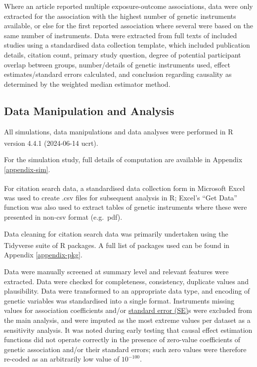 \documentclass[
]{article}
\begin{document}
Where an article reported multiple exposure-outcome associations, data were only extracted for the association with the highest number of genetic instruments available, or else for the first reported association where several were based on the same number of instruments. Data were extracted from full texts of included studies using a standardised data collection template, which included publication details, citation count, primary study question, degree of potential participant overlap between groups, number/details of genetic instruments used, effect estimates/standard errors calculated, and conclusion regarding causality as determined by the weighted median estimator method.

\subsection{Data Manipulation and Analysis}\label{data-manipulation-and-analysis}

All simulations, data manipulations and data analyses were performed in R version 4.4.1 (2024-06-14 ucrt)\textsuperscript{}.

For the simulation study, full details of computation are available in Appendix \ref{appendix-sim}.

For citation search data, a standardised data collection form in Microsoft Excel\textsuperscript{} was used to create .csv files for subsequent analysis in R; Excel's ``Get Data'' function was also used to extract tables of genetic instruments where these were presented in non-csv format (e.g.~pdf).

Data cleaning for citation search data was primarily undertaken using the Tidyverse suite of R packages\textsuperscript{}. A full list of packages used can be found in Appendix \ref{appendix-pkg}.

Data were manually screened at summary level and relevant features were extracted. Data were checked for completeness, consistency, duplicate values and plausibility. Data were transformed to an appropriate data type, and encoding of genetic variables was standardised into a single format. Instruments missing values for association coefficients and/or \hyperref[acronyms_SE]{standard error (SE)}s were excluded from the main analysis, and were imputed as the most extreme values per dataset as a sensitivity analysis. It was noted during early testing that causal effect estimation functions did not operate correctly in the presence of zero-value coefficients of genetic association and/or their standard errors; such zero values were therefore re-coded as an arbitrarily low value of \(10^{-100}\).
\end{document}
